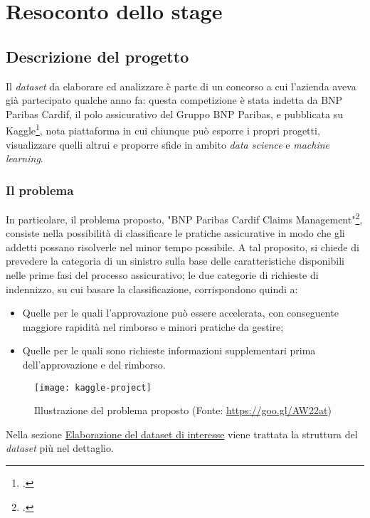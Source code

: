 
\chapter{Resoconto dello stage}
\label{cap:resoconto-stage}

\section{Descrizione del progetto}
Il \textit{dataset} da elaborare ed analizzare è parte di un concorso a cui l'azienda aveva già partecipato qualche anno fa: questa competizione è stata indetta da BNP Paribas Cardif, il polo assicurativo del Gruppo BNP Paribas, e pubblicata su Kaggle\footcite{https://www.kaggle.com/}, nota piattaforma in cui chiunque può esporre i propri progetti, visualizzare quelli altrui e proporre sfide in ambito \textit{data science} e \textit{machine learning}.

\subsection{Il problema}
In particolare, il problema proposto, "BNP Paribas Cardif Claims Management"\footcite{https://www.kaggle.com/c/bnp-paribas-cardif-claims-management}, consiste nella possibilità di classificare le pratiche assicurative in modo che gli addetti possano risolverle nel minor tempo possibile. A tal proposito, si chiede di prevedere la categoria di un sinistro sulla base delle caratteristiche disponibili nelle prime fasi del processo assicurativo; le due categorie di richieste di indennizzo, su cui basare la classificazione, corrispondono quindi a:
\begin{itemize}
	\item Quelle per le quali l'approvazione può essere accelerata, con conseguente maggiore rapidità nel rimborso e minori pratiche da gestire;
	\item Quelle per le quali sono richieste informazioni supplementari prima dell'approvazione e del rimborso.
\end{itemize}
\clearpage
\begin{figure}[!h] 
	\centering 
	\texttt{[image: kaggle-project]}
	\caption{Illustrazione del problema proposto (Fonte: \href{https://goo.gl/AW22at}{https://goo.gl/AW22at})}
\end{figure}
Nella sezione \hyperref[dataset]{Elaborazione del dataset di interesse} viene trattata la struttura del \textit{dataset} più nel dettaglio.

